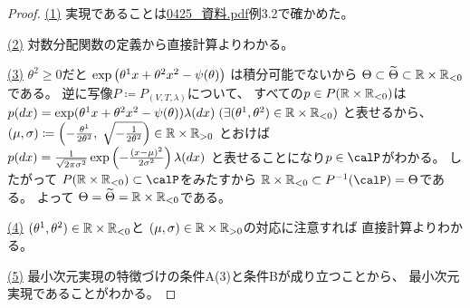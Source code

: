 \documentclass[report]{jlreq}
\begin{document}
\begin{proof}
    \uline{(1)} \quad
    実現であることは\url{0425_資料.pdf}例3.2で確かめた。

    \uline{(2)} \quad
    対数分配関数の定義から直接計算よりわかる。

    \uline{(3)} \quad
    $\theta^2 \ge 0$だと
    $\exp\left({
        \theta^1 x
        + \theta^2 x^2
        - \psi(\theta)
    }\right)$
    は積分可能でないから
    $\Theta \subset \widetilde{\Theta} \subset \mathbb{R} \times \mathbb{R}_{< 0}$
    である。
    逆に写像$P \coloneqq P_{(V, T, \lambda)}$について、
    すべての$p \in P(\mathbb{R} \times \mathbb{R}_{< 0})$は
    $p(dx) = \exp(
        \theta^1 x
        + \theta^2 x^2
        - \psi(\theta)
    ) \lambda(dx)
        \; (\exists (\theta^1, \theta^2) \in \mathbb{R} \times \mathbb{R}_{< 0})$
    と表せるから、
    $(\mu, \sigma) \coloneqq \left({
        - \frac{\theta^1}{2\theta^2}, \;
        \sqrt{- \frac{1}{2\theta^2}}
    }\right) \in \mathbb{R} \times \mathbb{R}_{> 0}$
    とおけば
    $p(dx) = \frac{1}{\sqrt{2 \pi \sigma^2}}
        \exp\left({
            - \frac{(x - \mu)^2}{2 \sigma^2}
        }\right) \lambda(dx)$
    と表せることになり$p \in \calP$がわかる。
    したがって
    $P(\R \times \R_{< 0}) \subset \calP$をみたすから
    $\R \times \R_{< 0} \subset P^{-1}(\calP) =  \Theta$である。
    よって
    $\Theta = \widetilde{\Theta} = \mathbb{R} \times \mathbb{R}_{< 0}$である。

    \uline{(4)} \quad
    $(\theta^1, \theta^2) \in \mathbb{R} \times \mathbb{R}_{< 0}$と
    $(\mu, \sigma) \in \mathbb{R} \times \mathbb{R}_{> 0}$の対応に注意すれば
    直接計算よりわかる。

    \uline{(5)} \quad
    最小次元実現の特徴づけの条件A(3)と条件Bが成り立つことから、
    最小次元実現であることがわかる。
\end{proof}
\end{document}
